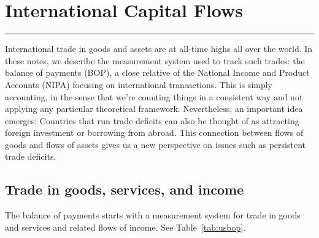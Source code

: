 \chapter{International Capital Flows}\label{chp:bop}
\hypertarget{bop}{}


\rule{\textwidth}{1pt}

International trade in goods and assets are at all-time highs all
over the world.
In these notes, we describe the measurement system
used to track such trades:  the balance of payments (BOP), a close
relative of the National Income and Product Accounts (NIPA) focusing
on international transactions.  This is simply accounting, in the
sense that we're counting things in a consistent way and not
applying any particular theoretical framework.  Nevertheless, an
important idea emerges: Countries that run trade deficits can also
be thought of as attracting foreign investment or borrowing from
abroad. This connection between flows of goods and flows of assets
gives us a new perspective on issues such as persistent trade deficits.


\section{Trade in goods, services, and income}

The balance of payments starts with a measurement system
for trade in goods and services and related flows of income.
See Table~\ref{tab:usbop}.


